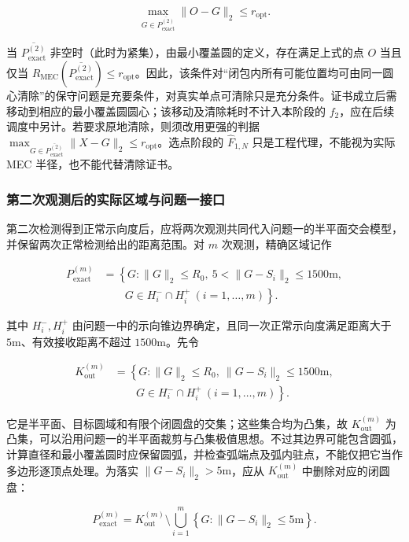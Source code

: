 \[
\max_{G\in\overline{P_{\mathrm{exact}}^{(2)}}}\lVert O-G\rVert_2\le r_{\mathrm{opt}}.
\]

当 $\overline{P_{\mathrm{exact}}^{(2)}}$ 非空时（此时为紧集），由最小覆盖圆的定义，存在满足上式的点 $O$ 当且仅当 $R_{\mathrm{MEC}}(\overline{P_{\mathrm{exact}}^{(2)}})\le r_{\mathrm{opt}}$。因此，该条件对“闭包内所有可能位置均可由同一圆心清除”的保守问题是充要条件，对真实单点可清除只是充分条件。证书成立后需移动到相应的最小覆盖圆圆心；该移动及清除耗时不计入本阶段的 $f_2$，应在后续调度中另计。若要求原地清除，则须改用更强的判据 $\max_{G\in\overline{P_{\mathrm{exact}}^{(2)}}}\lVert X-G\rVert_2\le r_{\mathrm{opt}}$。选点阶段的 $\widehat F_{1,N}$ 只是工程代理，不能视为实际 MEC 半径，也不能代替清除证书。

\subsubsection{第二次观测后的实际区域与问题一接口}

第二次检测得到正常示向度后，应将两次观测共同代入问题一的半平面交会模型，并保留两次正常检测给出的距离范围。对 $m$ 次观测，精确区域记作

\[
\begin{aligned}
P_{\mathrm{exact}}^{(m)}
&=\left\{G:
\lVert G\rVert_2\le R_0,\ 5<\lVert G-S_i\rVert_2\le1500\mathrm{m},\right.\\
&\qquad\left.G\in H_i^-\cap H_i^+\ (i=1,\ldots,m)\right\}.
\end{aligned}
\]

其中 $H_i^-,H_i^+$ 由问题一中的示向锥边界确定，且同一次正常示向度满足距离大于 $5\mathrm{m}$、有效接收距离不超过 $1500\mathrm{m}$。先令

\[
\begin{aligned}
K_{\mathrm{out}}^{(m)}
&=\left\{G:\lVert G\rVert_2\le R_0,
\ \lVert G-S_i\rVert_2\le1500\mathrm{m},\right.\\
&\qquad\left.G\in H_i^-\cap H_i^+\ (i=1,\ldots,m)\right\}.
\end{aligned}
\]

它是半平面、目标圆域和有限个闭圆盘的交集；这些集合均为凸集，故 $K_{\mathrm{out}}^{(m)}$ 为凸集，可以沿用问题一的半平面裁剪与凸集极值思想。不过其边界可能包含圆弧，计算直径和最小覆盖圆时应保留圆弧，并检查弧端点及弧内驻点，不能仅把它当作多边形逐顶点处理。为落实 $\lVert G-S_i\rVert_2>5\mathrm{m}$，应从 $K_{\mathrm{out}}^{(m)}$ 中删除对应的闭圆盘：

\[
P_{\mathrm{exact}}^{(m)}
=
K_{\mathrm{out}}^{(m)}\setminus
\bigcup_{i=1}^{m}\left\{G:\lVert G-S_i\rVert_2\le5\mathrm{m}\right\}.
\]

